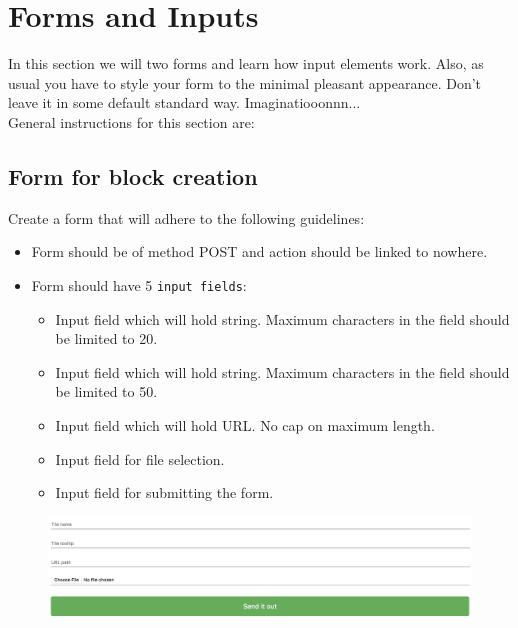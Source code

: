 \documentclass{42-en}
\begin{document}
        
        \section{Forms and Inputs}
        In this section we will two forms and learn how input elements work. Also, as usual you have to style your form to the minimal pleasant appearance. Don't leave it in some default standard way. Imaginatiooonnn...\\

        General instructions for this section are:
        \subsection{Form for block creation}
            Create a form that will adhere to the following guidelines:
            \begin{itemize}\itemsep3pt
                \item Form should be of method POST and action should be linked to nowhere.
                \item Form should have 5 \texttt{input fields}:
                \begin{itemize}
                    \item Input field which will hold string. Maximum characters in the field should be limited to 20.
                    \item Input field which will hold string. Maximum characters in the field should be limited to 50.
                    \item Input field which will hold URL. No cap on maximum length.
                    \item Input field for file selection.
                    \item Input field for submitting the form.
                \end{itemize}
            \end{itemize}
            \begin{figure}[H]
                \begin{center}
                    \includegraphics[width=15cm]{form1p2.png}
                \end{center}
            \end{figure}
\end{document}
